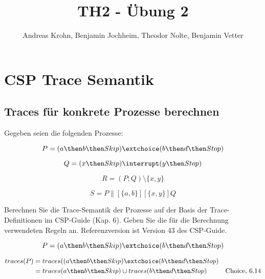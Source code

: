 \documentclass{scrreprt}
\begin{document}
\author{Andreas Krohn, Benjamin Jochheim, Theodor Nolte, Benjamin Vetter}
\title{TH2 - Übung 2}

\maketitle

\chapter{CSP Trace Semantik}

\section{Traces für konkrete Prozesse berechnen}

Gegeben seien die folgenden Prozesse:

\begin{equation*}
  P = (a \then b \then Skip) \extchoice (b \then d \then Stop)
\end{equation*}

\begin{equation*}
  Q = (x \then Skip) \interrupt (y \then Stop)
\end{equation*}

\begin{equation*}
  R = (P; Q) \setminus \{ x, y \}
\end{equation*}

\begin{equation*}
  S = P \parallel[\{a, b\}][\{x, y\}] Q
\end{equation*}

Berechnen Sie die Trace-Semantik der Prozesse auf der Basis der Trace-Definitionen im CSP-Guide (Kap. 6). Geben Sie die für die Berechnung verwendeten Regeln an. Referenzversion ist Version 43 des CSP-Guide.

\newpage

\begin{equation*}
  P = (a \then b \then Skip) \extchoice (b \then d \then Stop)
\end{equation*}

\begin{align*}
  traces(P) &= traces((a \then b \then Skip) \extchoice (b \then d \then Stop) \\
            &= traces(a \then b \then Skip) \cup traces(b \then d \then Stop) & \text{Choice, 6.14} \\
\end{align*}
\end{document}
